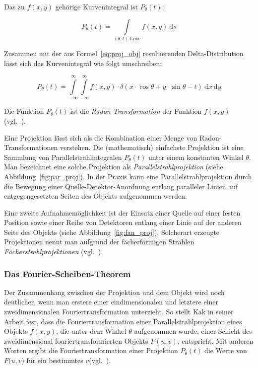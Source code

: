 Das zu $f(x, y)$ gehörige Kurvenintegral ist $P_{\theta}(t)$:

\begin{equation}\label{eq:proj_int}
    P_{\theta}(t) = \int\limits_{(\theta, t)\text{-Linie}} f(x, y)\ \mathrm{d}s
\end{equation}

Zusammen mit der aus Formel~\ref{eq:proj_obj} resultierenden Delta-Distribution lässt sich das Kurvenintegral wie folgt
umschreiben:

\begin{equation}\label{eq:proj_radon}
    P_{\theta}(t) = \int\limits_{-\infty}^{\infty}\int\limits_{-\infty}^{\infty}f(x, y) \cdot \delta(x \cdot
                    \cos \theta + y \cdot \sin \theta - t)\ \mathrm{d} x\ \mathrm{d} y
\end{equation}

Die Funktion $P_{\theta}(t)$ ist die \textit{Radon-Transformation} der Funktion $f(x, y)$ (vgl.~\cite{radon}).

Eine Projektion lässt sich als die Kombination einer Menge von Radon-Transformationen verstehen. Die
(mathematisch) einfachste Projektion ist eine Sammlung von Parallelstrahlintegralen $P_{\theta}(t)$ unter einem
konstanten Winkel $\theta$. Man bezeichnet eine solche Projektion als \textit{Parallelstrahlprojektion} (siehe
Abbildung~\ref{fig:par_proj}). In der Praxis kann eine Parallelstrahlprojektion durch die Bewegung einer
Quelle-Detektor-Anordnung entlang paralleler Linien auf entgegengesetzten Seiten des Objekts aufgenommen werden.

Eine zweite Aufnahmemöglichkeit ist der Einsatz einer Quelle auf einer festen Position sowie einer Reihe von Detektoren
entlang einer Linie auf der anderen Seite des Objekts (siehe Abbildung~\ref{fig:fan_proj}). Solcherart erzeugte
Projektionen nennt man aufgrund der fächerförmigen Strahlen \textit{Fächerstrahlprojektionen} (vgl.~\cite{kakslan}).

\subsubsection{Das Fourier-Scheiben-Theorem}

Der Zusammenhang zwischen der Projektion und dem Objekt wird noch deutlicher, wenn man erstere einer eindimensionalen
und letztere einer zweidimensionalen Fouriertransformation unterzieht. So stellt Kak in seiner Arbeit fest, dass die
Fouriertransformation einer Parallelstrahlprojektion eines Objekts $f(x, y)$, die unter dem Winkel $\theta$
aufgenommen wurde, einer Schicht des zweidimensional fouriertransformierten Objekts $F(u, v)$, entspricht. Mit anderen
Worten ergibt die Fouriertransformation einer Projektion $P_{\theta}(t)$ die Werte von $F(u, v$) für ein bestimmtes
$v$(vgl.~\cite{kak85}).

